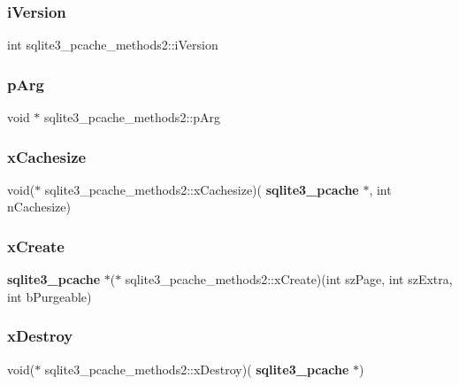 \subsubsection{iVersion}
{\footnotesize\ttfamily int sqlite3\+\_\+pcache\+\_\+methods2\+::i\+Version}

\mbox{\label{structsqlite3__pcache__methods2_a4bea91c33987eef02122bbf8a49745de}} 
\subsubsection{pArg}
{\footnotesize\ttfamily void $\ast$ sqlite3\+\_\+pcache\+\_\+methods2\+::p\+Arg}

\mbox{\label{structsqlite3__pcache__methods2_a4889ab0903938f485aa0fa4fc6925d26}} 
\subsubsection{xCachesize}
{\footnotesize\ttfamily void($\ast$ sqlite3\+\_\+pcache\+\_\+methods2\+::x\+Cachesize)(\textbf{ sqlite3\+\_\+pcache} $\ast$, int n\+Cachesize)}

\mbox{\label{structsqlite3__pcache__methods2_a91e7752b826e19e7c51c1fa0ce530f0f}} 
\subsubsection{xCreate}
{\footnotesize\ttfamily \textbf{ sqlite3\+\_\+pcache} $\ast$($\ast$ sqlite3\+\_\+pcache\+\_\+methods2\+::x\+Create)(int sz\+Page, int sz\+Extra, int b\+Purgeable)}

\mbox{\label{structsqlite3__pcache__methods2_a144d6e899889e80e00f93fb6c83359e2}} 
\subsubsection{xDestroy}
{\footnotesize\ttfamily void($\ast$ sqlite3\+\_\+pcache\+\_\+methods2\+::x\+Destroy)(\textbf{ sqlite3\+\_\+pcache} $\ast$)}

